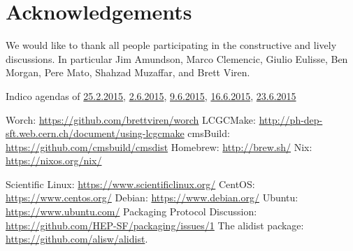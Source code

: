 \documentclass[12pt,a4paper]{article}
\begin{document}
\section*{Acknowledgements}
We would like to thank all people participating in the constructive and lively discussions. In particular Jim Amundson, Marco Clemencic, Giulio Eulisse, Ben Morgan, Pere Mato, Shahzad Muzaffar, and Brett Viren. 

\begin{thebibliography}{9}
 Indico agendas of \href{https://indico.cern.ch/event/373973/}{25.2.2015}, \href{https://indico.cern.ch/event/398344/}{2.6.2015}, \href{https://indico.cern.ch/event/400272/}{9.6.2015}, \href{https://indico.cern.ch/event/402229/}{16.6.2015}, \href{https://indico.cern.ch/event/403790/}{23.6.2015}

 Worch: \url{https://github.com/brettviren/worch}
 LCGCMake: \url{http://ph-dep-sft.web.cern.ch/document/using-lcgcmake}
 cmsBuild: \url{https://github.com/cmsbuild/cmsdist}
 Homebrew: \url{http://brew.sh/}
 Nix: \url{https://nixos.org/nix/}

 Scientific Linux: \url{https://www.scientificlinux.org/}
 CentOS: \url{https://www.centos.org/}
 Debian: \url{https://www.debian.org/}
 Ubuntu: \url{https://www.ubuntu.com/}
 Packaging Protocol Discussion:  \url{https://github.com/HEP-SF/packaging/issues/1}
 The alidist package: \url{https://github.com/alisw/alidist}.
\end{thebibliography}
\end{document}
